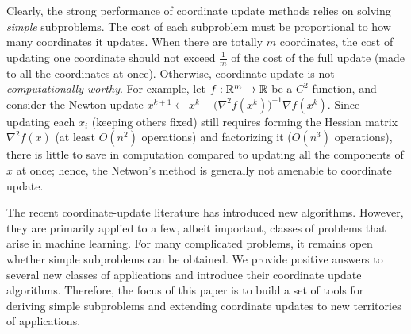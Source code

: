 
Clearly, the strong performance of coordinate
update methods relies on solving \emph{simple} subproblems. The cost of each subproblem must be proportional to how many coordinates it updates. %
When there are totally $m$ coordinates, the cost of updating one coordinate should not exceed $\frac{1}{m}$ of the cost of the full update (made to all the coordinates at once). Otherwise, coordinate update is not \emph{computationally worthy}. For example, let  $f:\mathbb{R}^m\to \mathbb{R}$ be  a $C^2$ function, and consider the Newton update  $x^{k+1} \gets x^k - \big(\nabla^2 f(x^k)\big)^{-1}\nabla f(x^k)$. Since updating each $x_i$ (keeping others  fixed) still requires forming the Hessian matrix $\nabla^2 f(x)$ (at least $O(n^2)$ operations) and factorizing it ($O(n^3)$ operations), there is little to save in computation compared to updating all the components of $x$ at once; hence, the Netwon's method is generally not amenable to coordinate update.

The recent coordinate-update literature has introduced new algorithms. However, they are primarily applied to a few, albeit important, classes of problems  that arise in machine learning. For many complicated problems,  it remains open whether simple subproblems can be obtained. We provide positive answers to several new classes of applications and introduce their coordinate update algorithms. %
Therefore, the focus of this paper is to build a set of tools for deriving simple subproblems and extending  coordinate updates to new territories of applications.

